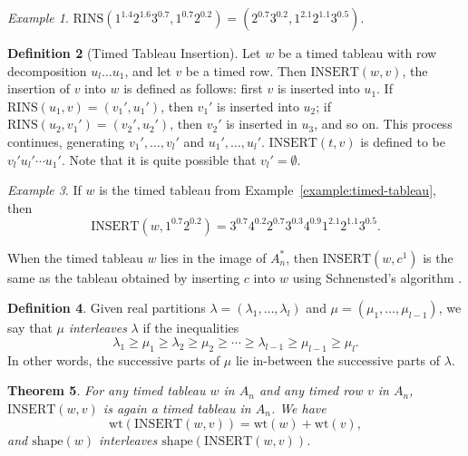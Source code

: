 \documentclass[10pt]{amsproc}
\newtheorem{theorem}{Theorem}[subsection]
\theoremstyle{definition}
\newtheorem{definition}[theorem]{Definition}
\theoremstyle{remark}
\newtheorem{example}[theorem]{Example}
\newcommand{\rowins}{\mathrm{RINS}}
\newcommand{\ins}{\mathrm{INSERT}}
\newcommand{\wt}{\mathrm{wt}}
\newcommand{\shape}{\mathrm{shape}}
\begin{document}
\begin{example}
  \label{example:timed-row-ins}
  $\rowins(1^{1.4}2^{1.6}3^{0.7},1^{0.7}2^{0.2})=(2^{0.7}3^{0.2},1^{2.1}2^{1.1}3^{0.5})$.
\end{example}
\begin{definition}
  [Timed Tableau Insertion]
  Let $w$ be a timed tableau with row decomposition $u_l\dotsc u_1$, and let $v$ be a timed row.
  Then $\ins(w, v)$, the insertion of $v$ into $w$ is defined as follows:
  first $v$ is inserted into $u_1$.
  If $\rowins(u_1,v)=(v_1',u_1')$, then $v_1'$ is inserted into $u_2$; if $\rowins(u_2,v_1')=(v_2',u_2')$, then $v_2'$ is inserted in $u_3$, and so on.
  This process continues, generating $v_1',\dotsc,v_l'$ and $u_1',\dotsc,u_l'$.
  $\ins(t,v)$ is defined to be $v_l'u_l'\dotsb u_1'$.
  Note that it is quite possible that $v_l'=\emptyset$.
\end{definition}
\begin{example}
  If $w$ is the timed tableau from Example~\ref{example:timed-tableau}, then
  \begin{displaymath}
    \ins(w,1^{0.7}2^{0.2})=3^{0.7}4^{0.2}2^{0.7}3^{0.3}4^{0.9}1^{2.1}2^{1.1}3^{0.5}.
  \end{displaymath}
\end{example}
When the timed tableau $w$ lies in the image of $A_n^*$, then $\ins(w,c^1)$ is the same as the tableau obtained by inserting $c$ into $w$ using Schnensted's algorithm \cite[p.~180]{schensted}.
\begin{definition}
  Given real partitions $\lambda=(\lambda_1,\dotsc,\lambda_l)$ and $\mu=(\mu_1,\dotsc,\mu_{l-1})$, we say that $\mu$ \emph{interleaves} $\lambda$ if the inequalities
  \begin{displaymath}
    \lambda_1 \geq \mu_1 \geq \lambda_2 \geq \mu_2 \geq \dotsb \geq \lambda_{l-1}\geq \mu_{l-1}\geq \mu_l. 
  \end{displaymath}
  In other words, the successive parts of $\mu$ lie in-between the successive parts of $\lambda$.
\end{definition}
\begin{theorem}
  \label{theorem:tableauness-of-insertion}
  For any timed tableau $w$ in $A_n$ and any timed row $v$ in $A_n$, $\ins(w,v)$ is again a timed tableau in $A_n$.
  We have
  \begin{displaymath}
    \wt(\ins(w,v)) = \wt(w) + \wt(v),
  \end{displaymath}
  and $\shape(w)$ interleaves $\shape(\ins(w,v))$.
\end{theorem}
\end{document}

